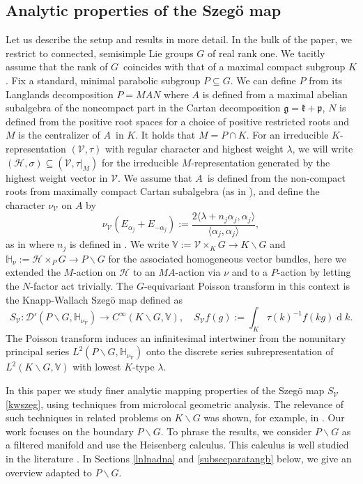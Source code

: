 \documentclass[a4paper,reqno]{amsart}
\numberwithin{equation}{section}
\def\rd{\operatorname{d}\!}
\theoremstyle{definition}
\theoremstyle{remark}
\begin{document}
\subsection{Analytic properties of the Szegö map}
Let us describe the setup and results in more detail. In the bulk of the paper, we restrict to connected, semisimple Lie  groups $G$ of real rank one. We tacitly assume that the rank of $G$ coincides with that of a  maximal compact subgroup $K$.  Fix a standard, minimal parabolic subgroup $P\subseteq G$. We can define $P$ from its Langlands decomposition $P=MAN$ where $A$ is defined from a maximal abelian subalgebra of the noncompact part in the Cartan decomposition $\mathfrak{g}=\mathfrak{k}+\mathfrak{p}$, $N$ is defined from the positive root spaces for a choice of positive restricted roots and $M$ is the centralizer of $A$ in $K$. It holds that $M=P\cap K$. For an irreducible $K$-representation $(\mathcal{V},\tau)$ with regular character and highest weight $\lambda$, we will write $(\mathcal{H},\sigma)\subseteq (\mathcal{V},\tau|_M)$ for the irreducible $M$-representation generated by the highest weight vector in $\mathcal{V}$. We assume that $A$ is defined from the non-compact roots from maximally compact Cartan subalgebra (as in \cite{knappwallach}), and define the character $\nu_{\mathcal{V}}$ on $A$ by 
$$\nu_{\mathcal{V}}(E_{\alpha_j}+E_{-\alpha_j}):=\frac{2\langle \lambda +n_j\alpha_j,\alpha_j\rangle}{\langle \alpha_j,\alpha_j\rangle},$$
as in \cite{knappwallach} where $n_j$ is defined in \cite[Equation (6.5.b)]{knappwallach}. We write $\mathbb{V}:=\mathcal{V}\times_K G\to K\backslash G$ and $\mathbb{H}_\nu:=\mathcal{H} \times_PG\to P\backslash G$ for the associated homogeneous vector bundles, here we extended the $M$-action on $\mathcal{H}$ to an $MA$-action via $\nu$ and to a $P$-action by letting the $N$-factor act trivially. The $G$-equivariant Poisson transform in this context is the Knapp-Wallach Szegö map defined as
\begin{equation}
\label{kwszeg}
S_{\mathcal{V}}:\mathcal{D}'(P\backslash G,\mathbb{H}_{\nu_{\mathcal{V}}})\to C^\infty(K\backslash G,\mathbb{V}), \quad S_{\mathcal{V}} f(g):=\int_K \tau(k)^{-1} f(kg)\rd k.
\end{equation}
The Poisson transform induces an infinitesimal intertwiner from the nonunitary principal series $L^2(P\backslash G,\mathbb{H}_{\nu_{\mathcal{V}}})$ onto the discrete series subrepresentation of $L^2(K\backslash G,\mathbb{V})$ with lowest $K$-type $\lambda$.


In this paper we study finer analytic mapping properties of the Szegö map $S_{\mathcal{V}}$ \eqref{kwszeg}, using techniques from microlocal geometric analysis. The relevance of such techniques in related problems on $K \backslash G$ was shown, for example, in \cite{gimppois,hansenhilg,mazzeovasy}. Our work focuses on the boundary $P\backslash G$. To phrase the results, we consider $P\backslash G$ as a filtered manifold and use the Heisenberg calculus. This calculus is well studied in the literature \cite{Dave_Haller1,ewertfixed,goffkuz,vanerpyunck}. In Sections \ref{lnlnadna} and \ref{subsecparatangb} below, we give an overview adapted to $P\backslash G$. 
\end{document}
